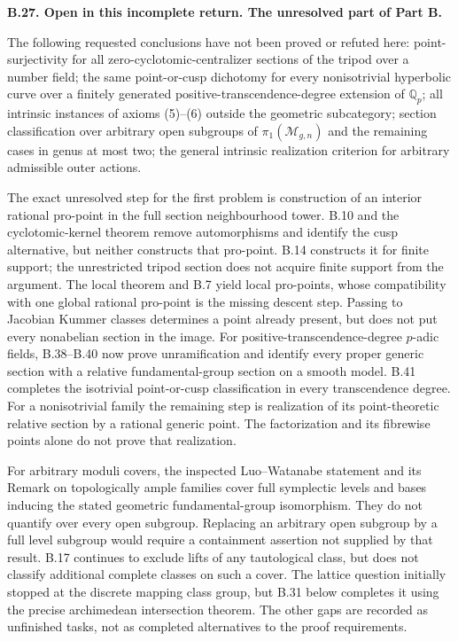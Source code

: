 \documentclass[11pt,oneside]{article}
\makeatletter
\newcounter{statementanchor}
\newenvironment{statement}[3]{%
 \refstepcounter{statementanchor}\def\@currentlabel{#1}%
 \par\addvspace{9pt}\noindent
 \textbf{#1. #2. #3.}\par\nobreak\noindent\ignorespaces
}{\par\addvspace{5pt}}
\makeatother
\begin{document}
\begin{statement}{B.27}{Open in this incomplete return}{The unresolved part of Part B}
\label{st:B.27}

The following requested conclusions have not been proved or
refuted here: point-surjectivity for all zero-cyclotomic-centralizer
sections of the tripod over a number field; the same point-or-cusp
dichotomy for every nonisotrivial hyperbolic curve over a finitely
generated positive-transcendence-degree extension of $\mathbb Q_p$;
all intrinsic instances of axioms
(5)--(6) outside the geometric subcategory; section classification
over arbitrary open subgroups of $\pi_1(\mathcal M_{g,n})$ and the
remaining cases in genus at most two; the general
intrinsic realization
criterion for arbitrary admissible outer actions.
\end{statement}
\noindent
The exact unresolved step for the first problem is construction
of an interior rational pro-point in the full section neighbourhood
tower.  B.10 and the cyclotomic-kernel theorem remove automorphisms
and identify the cusp alternative, but neither constructs that
pro-point.  B.14 constructs it for finite support; the unrestricted
tripod section does not acquire finite support from the argument.
The local theorem and B.7 yield local pro-points, whose compatibility
with one global rational pro-point is the missing descent step.
Passing to Jacobian Kummer classes determines a point already
present, but does not put every nonabelian section in the image.
For positive-transcendence-degree $p$-adic fields, B.38--B.40
now prove unramification and identify every proper generic
section with a relative fundamental-group section on a smooth
model. B.41 completes the isotrivial point-or-cusp classification
in every transcendence degree. For a nonisotrivial family the
remaining step is realization of its point-theoretic relative
section by a rational generic point. The factorization and
its fibrewise points alone do not prove that realization.

For arbitrary moduli covers, the inspected Luo--Watanabe statement
and its Remark on topologically ample families cover full symplectic
levels and bases inducing the stated geometric fundamental-group
isomorphism.  They do not quantify over every open subgroup.
Replacing an arbitrary open subgroup by a full level subgroup
would require a containment assertion not supplied by that result.
B.17 continues to exclude lifts of any tautological class, but
does not classify additional complete classes on such a cover.
The lattice question initially stopped at the discrete mapping
class group, but B.31 below completes it using the precise
archimedean intersection theorem.  The other gaps are recorded
as unfinished tasks, not as completed alternatives to the proof
requirements.
\end{document}
